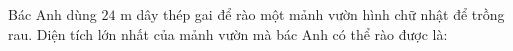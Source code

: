 \begin{ex}
Bác Anh dùng $24$ m dây thép gai để rào một mảnh vườn hình chữ nhật để trồng rau. Diện tích lớn nhất của mảnh vườn mà bác Anh có thể rào được là:
\end{ex}

